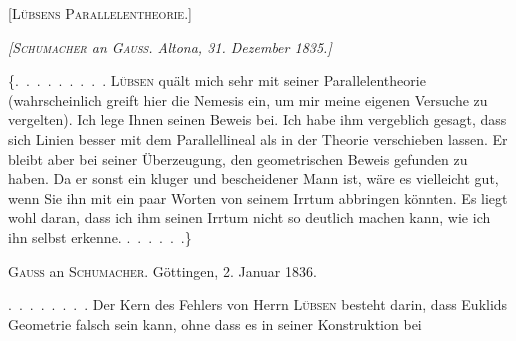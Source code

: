 \clearpage
{}%
\begin{center}
\Large\textsc{[Lübsens Parallelentheorie.]}
\end{center}


\begin{center}
\emph{[\textup{\textsc{Schumacher}} an \textup{\textsc{Gauss}}. Altona, 31. Dezember 1835.]}
\end{center}

\{\mbox{.\ .\ .\ .\ .\ .\ .\ .\ .} \textsc{Lübsen} quält mich sehr mit seiner Parallelentheorie
(wahrscheinlich greift hier die Nemesis ein, um mir meine eigenen
Versuche zu vergelten). Ich lege Ihnen seinen Beweis bei. Ich habe ihm
vergeblich gesagt, dass sich Linien besser mit dem
Parallellineal als in der Theorie verschieben lassen. Er bleibt aber bei
seiner Überzeugung, den geometrischen Beweis gefunden zu haben.
Da er sonst ein kluger und
bescheidener Mann ist, wäre es vielleicht gut, wenn Sie ihn mit ein paar Worten von seinem
Irrtum abbringen könnten. Es liegt wohl daran, dass ich ihm seinen
Irrtum nicht so deutlich machen kann, wie ich ihn selbst
erkenne. \mbox{.\ .\ .\ .\ .\ .}\}


\begin{center}
\textsc{Gauss} an \textsc{Schumacher}. Göttingen, 2. Januar 1836.
\end{center}

\mbox{.\ .\ .\ .\ .\ .\ .\ .} Der Kern des Fehlers von Herrn \textsc{Lübsen} besteht darin,
dass Euklids Geometrie falsch sein kann, ohne dass es in seiner
Konstruktion bei
